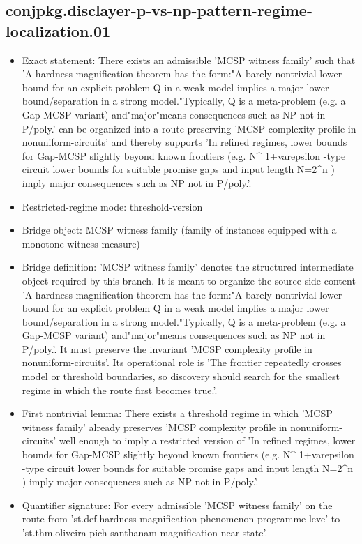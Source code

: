 \documentclass[11pt]{article}
\begin{document}
\subsection*{conjpkg.disclayer-p-vs-np-pattern-regime-localization.01}
\begin{itemize}
\item Exact statement: There exists an admissible 'MCSP witness family' such that 'A hardness magnification theorem has the form:"A barely-nontrivial lower bound for an explicit problem Q in a weak model implies a major lower bound/separation in a strong model."Typically, Q is a meta-problem (e.g. a Gap-MCSP variant) and"major"means consequences such as NP not in P/poly.' can be organized into a route preserving 'MCSP complexity profile in nonuniform-circuits' and thereby supports 'In refined regimes, lower bounds for Gap-MCSP slightly beyond known frontiers (e.g. N\textasciicircum{} 1+varepsilon -type circuit lower bounds for suitable promise gaps and input length N=2\textasciicircum{}n ) imply major consequences such as NP not in P/poly.'.
\item Restricted-regime mode: threshold-version
\item Bridge object: MCSP witness family (family of instances equipped with a monotone witness measure)
\item Bridge definition: 'MCSP witness family' denotes the structured intermediate object required by this branch. It is meant to organize the source-side content 'A hardness magnification theorem has the form:"A barely-nontrivial lower bound for an explicit problem Q in a weak model implies a major lower bound/separation in a strong model."Typically, Q is a meta-problem (e.g. a Gap-MCSP variant) and"major"means consequences such as NP not in P/poly.'. It must preserve the invariant 'MCSP complexity profile in nonuniform-circuits'. Its operational role is 'The frontier repeatedly crosses model or threshold boundaries, so discovery should search for the smallest regime in which the route first becomes true.'.
\item First nontrivial lemma: There exists a threshold regime in which 'MCSP witness family' already preserves 'MCSP complexity profile in nonuniform-circuits' well enough to imply a restricted version of 'In refined regimes, lower bounds for Gap-MCSP slightly beyond known frontiers (e.g. N\textasciicircum{} 1+varepsilon -type circuit lower bounds for suitable promise gaps and input length N=2\textasciicircum{}n ) imply major consequences such as NP not in P/poly.'.
\item Quantifier signature: For every admissible 'MCSP witness family' on the route from 'st.def.hardness-magnification-phenomenon-programme-leve' to 'st.thm.oliveira-pich-santhanam-magnification-near-state'.

\end{itemize}
\end{document}

